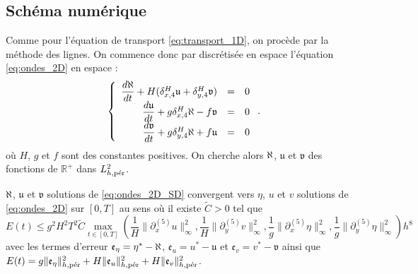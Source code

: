 \subsection{Schéma numérique}

Comme pour l'équation de transport \eqref{eq:transport_1D}, on procède par la méthode des lignes. On commence donc par discrétisée en espace l'équation \eqref{eq:ondes_2D} en espace :
\begin{equation}
\left\lbrace
\begin{array}{rcl}
\dfrac{d \etafrak}{dt} + H ( \delta_{x,4}^H \mathfrak{u} + \delta_{y,4}^H \mathfrak{v} ) & = & 0 \\
\dfrac{d \mathfrak{u}}{dt} + g \delta_{x,4}^H \etafrak - f \mathfrak{v} & = & 0 \\
\dfrac{d \mathfrak{v}}{dt} + g \delta_{y,4}^H \etafrak + f \mathfrak{u} & = & 0 \\
\end{array}
\right. .
\label{eq:ondes_2D_SD}
\end{equation}
où $H$, $g$ et $f$ sont des constantes positives.
On cherche alors $\etafrak$, $\mathfrak{u}$ et $\mathfrak{v}$ des fonctions de $\mathbb{R}^+$ dans $L^2_{h,\per}$.

\begin{proposition}
$\etafrak$, $\mathfrak{u}$ et $\mathfrak{v}$ solutions de \eqref{eq:ondes_2D_SD} convergent vers $\eta$, $u$ et $v$ solutions de \eqref{eq:ondes_2D} sur $[0,T]$ au sens où il existe $\tilde{C}>0$ tel que
\begin{equation}
E(t) \leq g^2 H^2 T^2 \tilde{C} \max_{t \in [0,T]} \left( \dfrac{1}{H} \| \partial_x^{(5)} u \|^2_{\infty}, \dfrac{1}{H} \| \partial_y^{(5)} v \|^2_{\infty}, \dfrac{1}{g} \| \partial_x^{(5)} \eta \|^2_{\infty}, \dfrac{1}{g} \| \partial_y^{(5)} \eta \|^2_{\infty}  \right) h^8
\end{equation}
avec les termes d'erreur $\mathfrak{e}_{\eta} = \eta^* - \etafrak$, $\mathfrak{e}_{u} = u^* - \mathfrak{u}$ et $\mathfrak{e}_{v} = v^* - \mathfrak{v}$ ainsi que $E(t) = g \| \mathfrak{e}_{\eta} \|^2_{h,\per} + H \| \mathfrak{e}_u \|^2_{h,\per} + H \| \mathfrak{e}_v \|^2_{h,\per}$.
\end{proposition}

